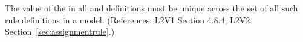 The value of the   in all \AssignmentRule and
\RateRule definitions must be unique across the set of all such rule
definitions in a model.  (References: L2V1 Section 4.8.4; L2V2
Section~\ref{sec:assignmentrule}.)

